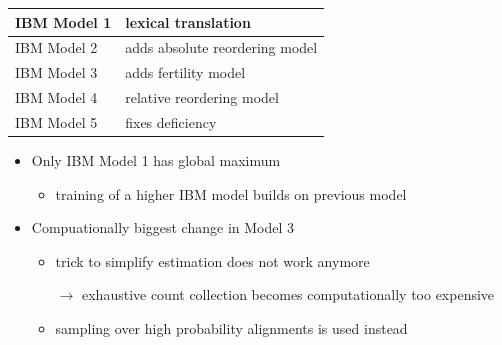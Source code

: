 \documentclass[landscape]{slides}
\begin{document}

\vspace{10mm}
\begin{center}
\begin{tabular}{|l|l|} \hline
IBM Model 1 & lexical translation \\ \hline
IBM Model 2 & adds absolute reordering model \\ \hline
IBM Model 3 & adds fertility model \\ \hline
IBM Model 4 & relative reordering model \\ \hline
IBM Model 5 & fixes deficiency \\ \hline
\end{tabular}
\end{center}
\begin{itemize}
\item Only IBM Model 1 has global maximum \vspace{-3mm}
\begin{itemize}
\item training of a higher IBM model builds on previous model
\end{itemize}
\item Compuationally biggest change in Model 3 \vspace{-3mm}
\begin{itemize} 
\item trick to simplify estimation does not work anymore
\item[$\rightarrow$] exhaustive count collection becomes computationally too expensive
\item sampling over high probability alignments is used instead
\end{itemize}
\end{itemize}


\end{document}
